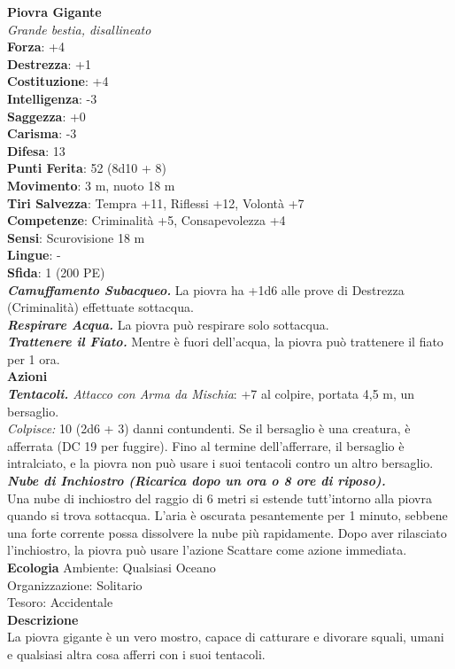 \begin{multicols}{2}
\medskip\textbf{Piovra Gigante}\\
\emph{Grande bestia, disallineato}\\
\textbf{Forza}: +4\\
\textbf{Destrezza}: +1\\
\textbf{Costituzione}: +4\\
\textbf{Intelligenza}: -3\\
\textbf{Saggezza}: +0\\
\textbf{Carisma}: -3\\
\textbf{Difesa}: 13\\
\textbf{Punti Ferita}: 52 (8d10 + 8)\\
\textbf{Movimento}: 3 m, nuoto 18 m\\
\textbf{Tiri Salvezza}: Tempra +11, Riflessi +12, Volontà +7 \\
\textbf{Competenze}: Criminalità +5, Consapevolezza +4\\
\textbf{Sensi}: Scurovisione 18 m\\
\textbf{Lingue}: -\\
\textbf{Sfida}: 1 (200 PE)\smallskip\\
\emph{\textbf{Camuffamento Subacqueo.}} La piovra ha +1d6 alle prove di Destrezza (Criminalità) effettuate sottacqua.\\
\emph{\textbf{Respirare Acqua.}} La piovra può respirare solo sottacqua.\\
\emph{\textbf{Trattenere il Fiato.}} Mentre è fuori dell'acqua, la piovra può trattenere il fiato per 1 ora.\\
\smallskip\textbf{Azioni}\\
\emph{\textbf{Tentacoli.} Attacco con Arma da Mischia}: +7 al colpire, portata 4,5 m, un bersaglio.\\
\emph{Colpisce:} 10 (2d6 + 3) danni contundenti. Se il bersaglio è una creatura, è afferrata (DC  19 per fuggire). Fino al termine dell'afferrare, il bersaglio è intralciato, e la piovra non può usare i suoi tentacoli contro un altro bersaglio.\\
\emph{\textbf{Nube di Inchiostro (Ricarica dopo un ora o 8 ore di riposo).}}\\
Una nube di inchiostro del raggio di 6 metri si estende tutt'intorno alla piovra quando si trova sottacqua. L'aria è oscurata pesantemente per 1 minuto, sebbene una forte corrente  possa dissolvere la nube più rapidamente. Dopo aver rilasciato  l'inchiostro, la piovra può usare l'azione Scattare come azione immediata. \\
\textbf{Ecologia}
Ambiente: Qualsiasi Oceano\\
Organizzazione: Solitario\\
Tesoro: Accidentale\\
\textbf{Descrizione}\\
La piovra gigante è un vero mostro, capace di catturare e divorare squali, umani e qualsiasi altra cosa afferri con i suoi tentacoli. \\


\end{multicols}
